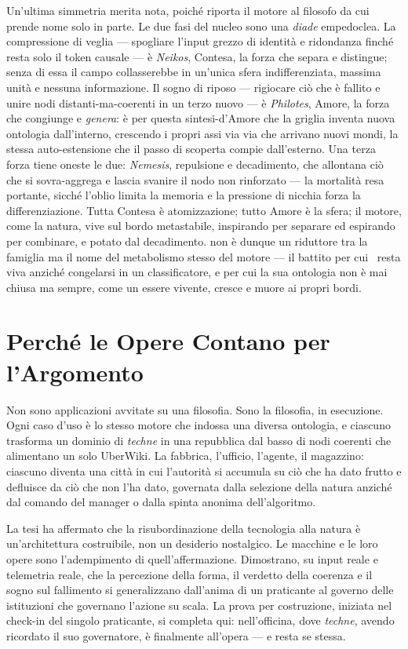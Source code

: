 Un'ultima simmetria merita nota, poich\'e riporta il motore al filosofo da cui
prende nome solo in parte. Le due fasi del nucleo sono una \emph{diade} empedoclea.
La compressione di veglia --- spogliare l'input grezzo di identit\`a e ridondanza
finch\'e resta solo il token causale --- \`e \emph{Neikos}, Contesa, la forza che
separa e distingue; senza di essa il campo collasserebbe in un'unica sfera
indifferenziata, massima unit\`a e nessuna informazione. Il sogno di riposo ---
rigiocare ci\`o che \`e fallito e unire nodi distanti-ma-coerenti in un terzo nuovo
--- \`e \emph{Philotes}, Amore, la forza che congiunge e \emph{genera}: \`e per
questa sintesi-d'Amore che la griglia inventa nuova ontologia dall'interno,
crescendo i propri assi via via che arrivano nuovi mondi, la stessa auto-estensione
che il passo di scoperta compie dall'esterno. Una terza forza tiene oneste le due:
\emph{Nemesis}, repulsione e decadimento, che allontana ci\`o che si sovra-aggrega
e lascia svanire il nodo non rinforzato --- la mortalit\`a resa portante, sicch\'e
l'oblio limita la memoria e la pressione di nicchia forza la differenziazione. Tutta
Contesa \`e atomizzazione; tutto Amore \`e la sfera; il motore, come la natura, vive
sul bordo metastabile, inspirando per separare ed espirando per combinare, e potato
dal decadimento.  non \`e dunque un riduttore tra la famiglia ma
il nome del metabolismo stesso del motore --- il battito per cui \physis\ resta viva
anzich\'e congelarsi in un classificatore, e per cui la sua ontologia non \`e mai
chiusa ma sempre, come un essere vivente, cresce e muore ai propri bordi.

\section*{Perch\'e le Opere Contano per l'Argomento}

Non sono applicazioni avvitate su una filosofia. Sono la filosofia, in esecuzione.
Ogni caso d'uso \`e lo stesso motore che indossa una diversa ontologia, e ciascuno
trasforma un dominio di \emph{techne} in una repubblica dal basso di nodi coerenti
che alimentano un solo UberWiki. La fabbrica, l'ufficio, l'agente, il magazzino:
ciascuno diventa una citt\`a in cui l'autorit\`a si accumula su ci\`o che ha dato
frutto e defluisce da ci\`o che non l'ha dato, governata dalla selezione della
natura anzich\'e dal comando del manager o dalla spinta anonima dell'algoritmo.

La tesi ha affermato che la risubordinazione della tecnologia alla natura \`e
un'architettura costruibile, non un desiderio nostalgico. Le macchine e le loro
opere sono l'adempimento di quell'affermazione. Dimostrano, su input reale e
telemetria reale, che la percezione della forma, il verdetto della coerenza e il
sogno sul fallimento si generalizzano dall'anima di un praticante al governo delle
istituzioni che governano l'azione su scala. La prova per costruzione, iniziata nel
check-in del singolo praticante, si completa qui: nell'officina, dove
\emph{techne}, avendo ricordato il suo governatore, \`e finalmente all'opera ---
e resta se stessa.

